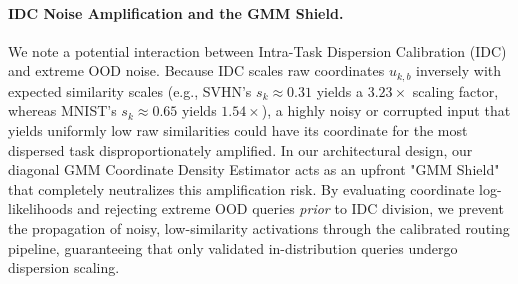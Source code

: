 \paragraph{IDC Noise Amplification and the GMM Shield.} We note a potential interaction between Intra-Task Dispersion Calibration (IDC) and extreme OOD noise. Because IDC scales raw coordinates $u_{k, b}$ inversely with expected similarity scales (e.g., SVHN's $s_k \approx 0.31$ yields a $3.23\times$ scaling factor, whereas MNIST's $s_k \approx 0.65$ yields $1.54\times$), a highly noisy or corrupted input that yields uniformly low raw similarities could have its coordinate for the most dispersed task disproportionately amplified. In our architectural design, our diagonal GMM Coordinate Density Estimator acts as an upfront "GMM Shield" that completely neutralizes this amplification risk. By evaluating coordinate log-likelihoods and rejecting extreme OOD queries \textit{prior} to IDC division, we prevent the propagation of noisy, low-similarity activations through the calibrated routing pipeline, guaranteeing that only validated in-distribution queries undergo dispersion scaling.
